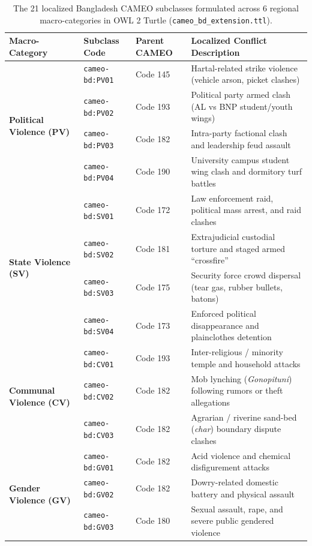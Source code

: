 \documentclass[11pt,a4paper]{article}
\begin{document}
\begin{table}[h]
\centering
\caption{The 21 localized Bangladesh CAMEO subclasses formulated across 6 regional macro-categories in OWL 2 Turtle (\texttt{cameo\_bd\_extension.ttl}).}
\label{tab:cameo_ext}
\small
\begin{tabular}{lllp{7.5cm}}
\toprule
\textbf{Macro-Category} & \textbf{Subclass Code} & \textbf{Parent CAMEO} & \textbf{Localized Conflict Description} \\
\midrule
\multirow{4}{*}{\textbf{Political Violence (PV)}} 
& \texttt{cameo-bd:PV01} & Code 145 & Hartal-related strike violence (vehicle arson, picket clashes) \\
& \texttt{cameo-bd:PV02} & Code 193 & Political party armed clash (AL vs BNP student/youth wings) \\
& \texttt{cameo-bd:PV03} & Code 182 & Intra-party factional clash and leadership feud assault \\
& \texttt{cameo-bd:PV04} & Code 190 & University campus student wing clash and dormitory turf battles \\
\midrule
\multirow{4}{*}{\textbf{State Violence (SV)}} 
& \texttt{cameo-bd:SV01} & Code 172 & Law enforcement raid, political mass arrest, and raid clashes \\
& \texttt{cameo-bd:SV02} & Code 181 & Extrajudicial custodial torture and staged armed ``crossfire'' \\
& \texttt{cameo-bd:SV03} & Code 175 & Security force crowd dispersal (tear gas, rubber bullets, batons) \\
& \texttt{cameo-bd:SV04} & Code 173 & Enforced political disappearance and plainclothes detention \\
\midrule
\multirow{3}{*}{\textbf{Communal Violence (CV)}} 
& \texttt{cameo-bd:CV01} & Code 193 & Inter-religious / minority temple and household attacks \\
& \texttt{cameo-bd:CV02} & Code 182 & Mob lynching (\textit{Gonopituni}) following rumors or theft allegations \\
& \texttt{cameo-bd:CV03} & Code 182 & Agrarian / riverine sand-bed (\textit{char}) boundary dispute clashes \\
\midrule
\multirow{4}{*}{\textbf{Gender Violence (GV)}} 
& \texttt{cameo-bd:GV01} & Code 182 & Acid violence and chemical disfigurement attacks \\
& \texttt{cameo-bd:GV02} & Code 182 & Dowry-related domestic battery and physical assault \\
& \texttt{cameo-bd:GV03} & Code 180 & Sexual assault, rape, and severe public gendered violence \\

\end{tabular}
\end{table}
\end{document}
